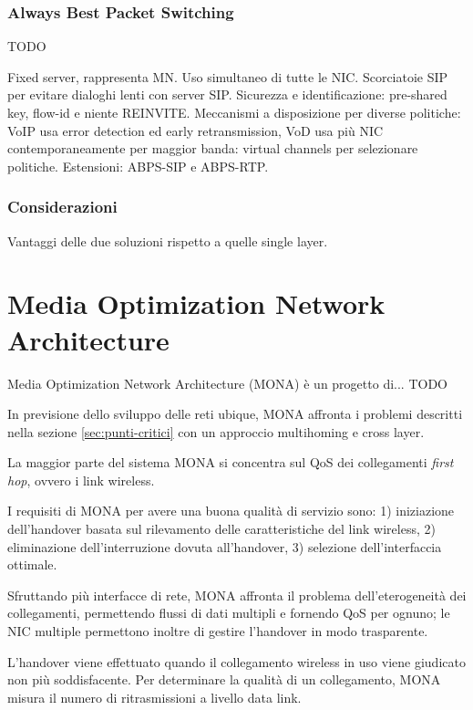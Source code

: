 \documentclass[12pt,a4paper,openright,twoside]{book}
\begin{document}
\subsection{Always Best Packet Switching}

TODO

Fixed server, rappresenta MN. Uso simultaneo di tutte le
NIC. Scorciatoie SIP per evitare dialoghi lenti con server
SIP. Sicurezza e identificazione: pre-shared key, flow-id e niente
REINVITE. Meccanismi a disposizione per diverse politiche: VoIP usa
error detection ed early retransmission, VoD usa più NIC
contemporaneamente per maggior banda: virtual channels per selezionare
politiche. Estensioni: ABPS-SIP e ABPS-RTP.


\subsection{Considerazioni}
Vantaggi delle due soluzioni rispetto a quelle single layer.

\clearpage{\pagestyle{empty}\cleardoublepage}


\chapter{Media Optimization Network Architecture}

Media Optimization Network Architecture (MONA) è un progetto
di... TODO

In previsione dello sviluppo delle reti ubique, MONA affronta i
problemi descritti nella sezione \ref{sec:punti-critici} con un
approccio multihoming e cross layer.

La maggior parte del sistema MONA si concentra sul QoS dei
collegamenti \emph{first hop}, ovvero i link wireless.

I requisiti di MONA per avere una buona qualità di servizio sono:
1) iniziazione dell'handover basata sul rilevamento delle
caratteristiche del link wireless, 2) eliminazione dell'interruzione
dovuta all'handover, 3) selezione dell'interfaccia ottimale.

Sfruttando più interfacce di rete, MONA affronta il problema
dell'eterogeneità dei collegamenti, permettendo flussi di dati
multipli e fornendo QoS per ognuno; le NIC multiple permettono inoltre
di gestire l'handover in modo trasparente.

L'handover viene effettuato quando il collegamento wireless in uso
viene giudicato non più soddisfacente. Per determinare la qualità di
un collegamento, MONA misura il numero di ritrasmissioni a livello
data link.
\end{document}
